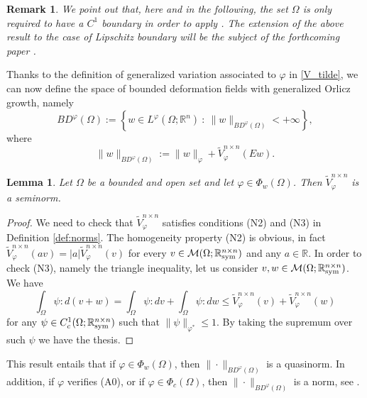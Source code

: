 \documentclass[a4paper,11pt,oneside,notitlepage]{article}
\newtheorem{lemma}[theorem]{Lemma}
\newtheorem{remark}[theorem]{Remark}
\numberwithin{equation}{section}
\def\R{\mathbb{R}}
\def\M{\mathcal{M}}
\def\sym{{\rm sym}}
\newcommand{\vphi}{\varphi}
\newcommand{\st}{ \ : \ }
\begin{document}
\begin{remark}
    We point out that, here and in the following, the set $\Omega$ is only required to have a $C^1$ boundary in order to apply \cite[Chapter II, Theorem 2.3]{temam}. The extension of the above result to the case of Lipschitz boundary will be the subject of the forthcoming paper \cite{DR25}.
\end{remark}



Thanks to the definition of generalized variation associated to $\vphi$ in \eqref{V_tilde}, we can now define the space of bounded deformation fields with generalized Orlicz growth, namely
\begin{equation}
\label{BD_phi}
    BD^\vphi(\Omega) := \left\{ w \in L^\vphi(\Omega;\R^n) \st \|w\|_{BD^\vphi(\Omega)} < +\infty \right\},
\end{equation}
where
\begin{equation*}
    \|w\|_{BD^\vphi(\Omega)} := \|w\|_\vphi + \widetilde{V}^{n \times n}_\vphi(Ew).
\end{equation*}

\begin{lemma}
\label{lmm:seminorm}
    Let $\Omega$ be a bounded and open set and let $\vphi \in \Phi_w(\Omega)$. Then $\widetilde{V}^{n\times n}_\vphi$ is a seminorm.
\end{lemma}
\begin{proof}
    We need to check that $\widetilde{V}^{n \times n}_\vphi$ satisfies conditions (N2) and (N3) in Definition \ref{def:norms}. The homogeneity property (N2) is obvious, in fact $\widetilde{V}^{n \times n}_\vphi(av) = |a|\widetilde{V}^{n \times n}_\vphi(v)$ for every $v \in \M(\Omega;\R^{n \times n}_\sym)$ and any $a \in \R$. In order to check (N3), namely the triangle inequality, let us consider $v,w \in \M(\Omega;\R^{n \times n}_\sym)$. We have
    \begin{equation*}
        \int_\Omega \psi : d(v+w) = \int_\Omega \psi : dv + \int_\Omega \psi : dw \le \widetilde{V}^{n \times n}_\vphi(v) + \widetilde{V}^{n \times n}_\vphi(w)
    \end{equation*}
    for any $\psi \in C^1_c(\Omega;\R^{n \times n}_\sym)$ such that $\|\psi\|_{\vphi^*} \le 1$. By taking the supremum over such $\psi$ we have the thesis.
\end{proof}

This result entails that if $\vphi \in \Phi_w(\Omega)$, then $\|\cdot\|_{BD^\vphi(\Omega)}$ is a quasinorm. In addition, if $\vphi$ verifies (A0), or if $\vphi \in \Phi_c(\Omega)$, then $\|\cdot\|_{BD^\vphi(\Omega)}$ is a norm, see \cite[Lemma 3.2.2 \& Theorem 3.7.13]{HaH}.
\end{document}
